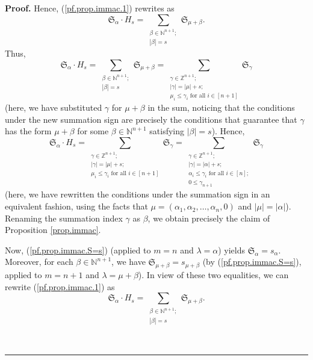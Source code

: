 \documentclass
[numbers=enddot,12pt,final,onecolumn,notitlepage,english]{scrartcl}%
\theoremstyle{definition}
\newenvironment{proof}[1][Proof]{\noindent\textbf{#1.} }{\ \rule{0.5em}{0.5em}}
\let\sumnonlimits\sum
\renewcommand{\sum}{\sumnonlimits\limits}
\newenvironment{verlong}{}{}
\newenvironment{vershort}{}{}
\begin{document}
\begin{proof}
\begin{vershort}
Hence, (\ref{pf.prop.immac.1}) rewrites as
\begin{equation}
\mathfrak{S}_{\alpha}\cdot H_{s}=\sum_{\substack{\beta\in\mathbb{N}%
^{n+1};\\\left\vert \beta\right\vert =s}}\mathfrak{S}_{\mu+\beta}.
\label{pf.prop.immac.short.2}%
\end{equation}
Thus,
\[
\mathfrak{S}_{\alpha}\cdot H_{s}=\sum_{\substack{\beta\in\mathbb{N}%
^{n+1};\\\left\vert \beta\right\vert =s}}\mathfrak{S}_{\mu+\beta}%
=\sum_{\substack{\gamma\in\mathbb{Z}^{n+1};\\\left\vert \gamma\right\vert
=\left\vert \mu\right\vert +s;\\\mu_{i}\leq\gamma_{i}\text{ for all }%
i\in\left[  n+1\right]  }}\mathfrak{S}_{\gamma}%
\]
(here, we have substituted $\gamma$ for $\mu+\beta$ in the sum, noticing that
the conditions under the new summation sign are precisely the conditions that
guarantee that $\gamma$ has the form $\mu+\beta$ for some $\beta\in
\mathbb{N}^{n+1}$ satisfying $\left\vert \beta\right\vert =s$). Hence,%
\[
\mathfrak{S}_{\alpha}\cdot H_{s}=\sum_{\substack{\gamma\in\mathbb{Z}%
^{n+1};\\\left\vert \gamma\right\vert =\left\vert \mu\right\vert +s;\\\mu
_{i}\leq\gamma_{i}\text{ for all }i\in\left[  n+1\right]  }}\mathfrak{S}%
_{\gamma}=\sum_{\substack{\gamma\in\mathbb{Z}^{n+1};\\\left\vert
\gamma\right\vert =\left\vert \alpha\right\vert +s;\\\alpha_{i}\leq\gamma
_{i}\text{ for all }i\in\left[  n\right]  ;\\0\leq\gamma_{n+1}}}\mathfrak{S}%
_{\gamma}%
\]
(here, we have rewritten the conditions under the summation sign in an
equivalent fashion, using the facts that $\mu=\left(  \alpha_{1},\alpha
_{2},\ldots,\alpha_{n},0\right)  $ and $\left\vert \mu\right\vert =\left\vert
\alpha\right\vert $). Renaming the summation index $\gamma$ as $\beta$, we
obtain precisely the claim of Proposition \ref{prop.immac}. \qedhere

\end{vershort}

\begin{verlong}
Now, (\ref{pf.prop.immac.S=s}) (applied to $m=n$ and $\lambda=\alpha$) yields
$\mathfrak{S}_{\alpha}=s_{\alpha}$. Moreover, for each $\beta\in
\mathbb{N}^{n+1}$, we have $\mathfrak{S}_{\mu+\beta}=s_{\mu+\beta}$ (by
(\ref{pf.prop.immac.S=s}), applied to $m=n+1$ and $\lambda=\mu+\beta$). In
view of these two equalities, we can rewrite (\ref{pf.prop.immac.1}) as%
\begin{equation}
\mathfrak{S}_{\alpha}\cdot H_{s}=\sum_{\substack{\beta\in\mathbb{N}%
^{n+1};\\\left\vert \beta\right\vert =s}}\mathfrak{S}_{\mu+\beta}.
\label{pf.prop.immac.2}%
\end{equation}



\end{verlong}
\end{proof}
\end{document}
